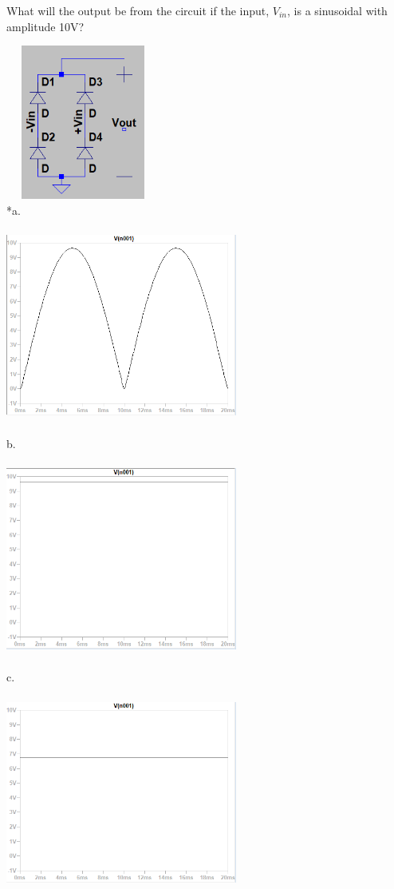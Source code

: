 
What will the output be from the circuit if the input, $V_{in}$, is a sinusoidal with amplitude 10V?

\includegraphics[width=2in,height=2in]{../../Images/OPampsTransistorsDiodesQ17.png} \\

*a.

\includegraphics[width=3in,height=2.5in]{../../Images/OPampsTransistorsDiodesQ17a.png}

b.

\includegraphics[width=3in,height=2.5in]{../../Images/OPampsTransistorsDiodesQ17b.png}

c.

\includegraphics[width=3in,height=2.5in]{../../Images/OPampsTransistorsDiodesQ17c.png}

